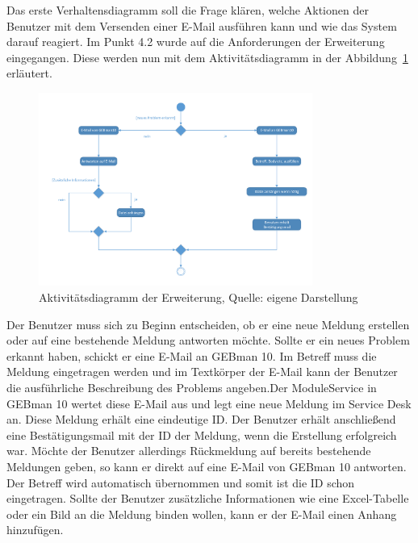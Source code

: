 \noindent
Das erste Verhaltensdiagramm soll die Frage klären, welche Aktionen der Benutzer mit dem Versenden einer E-Mail ausführen kann und wie das System darauf reagiert. Im Punkt 4.2 wurde auf die Anforderungen der Erweiterung eingegangen. Diese werden nun mit dem Aktivitätsdiagramm  in der Abbildung~\ref{fig:Aktivitaetsdiagramm} erläutert.

\begin{figure}[h!]
\centering
\includegraphics[width=0.80\textwidth]{Abbildungen/Aktivitaetsdiagramm.pdf}
	\caption[Aktivit{\"a}tsdiagramm der Erweiterung]{Aktivit{\"a}tsdiagramm der Erweiterung, Quelle: eigene Darstellung}
	\label{fig:Aktivitaetsdiagramm}
\end{figure}

\noindent
Der Benutzer muss sich zu Beginn entscheiden, ob er eine neue Meldung erstellen oder auf eine bestehende Meldung antworten möchte. Sollte er ein neues Problem erkannt haben, schickt er eine E-Mail an GEBman 10. Im Betreff muss die Meldung eingetragen werden und im Textkörper der E-Mail kann der Benutzer die ausführliche Beschreibung des Problems angeben.\newline Der ModuleService in  GEBman 10 wertet diese E-Mail aus und legt eine neue Meldung im Service Desk an. Diese Meldung erhält eine eindeutige ID. Der Benutzer erhält anschließend eine Bestätigungsmail mit der ID der Meldung, wenn die Erstellung erfolgreich war.\newline
Möchte der Benutzer allerdings Rückmeldung auf bereits bestehende Meldungen geben, so kann er direkt auf eine E-Mail von GEBman 10 antworten. Der Betreff wird automatisch übernommen und somit ist die ID schon eingetragen. Sollte der Benutzer zusätzliche Informationen wie eine Excel-Tabelle oder ein Bild an die Meldung binden wollen, kann er der E-Mail einen Anhang hinzufügen.\\\\

